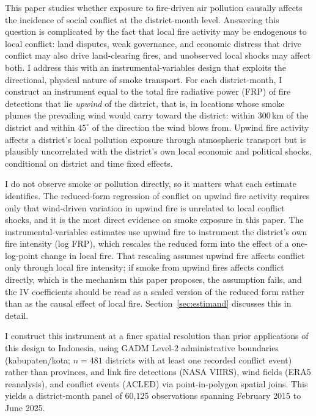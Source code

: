 \documentclass[12pt]{article}
\begin{document}
This paper studies whether exposure to fire-driven air pollution causally affects the incidence of social conflict at the district-month level. Answering this question is complicated by the fact that local fire activity may be endogenous to local conflict: land disputes, weak governance, and economic distress that drive conflict may also drive land-clearing fires, and unobserved local shocks may affect both. I address this with an instrumental-variables design that exploits the directional, physical nature of smoke transport. For each district-month, I construct an instrument equal to the total fire radiative power (FRP) of fire detections that lie \emph{upwind} of the district, that is, in locations whose smoke plumes the prevailing wind would carry toward the district: within 300\,km of the district and within $45^{\circ}$ of the direction the wind blows from. Upwind fire activity affects a district's local pollution exposure through atmospheric transport but is plausibly uncorrelated with the district's own local economic and political shocks, conditional on district and time fixed effects.

I do not observe smoke or pollution directly, so it matters what each estimate identifies. The reduced-form regression of conflict on upwind fire activity requires only that wind-driven variation in upwind fire is unrelated to local conflict shocks, and it is the most direct evidence on smoke exposure in this paper. The instrumental-variables estimates use upwind fire to instrument the district's own fire intensity (log FRP), which rescales the reduced form into the effect of a one-log-point change in local fire. That rescaling assumes upwind fire affects conflict only through local fire intensity; if smoke from upwind fires affects conflict directly, which is the mechanism this paper proposes, the assumption fails, and the IV coefficients should be read as a scaled version of the reduced form rather than as the causal effect of local fire. Section~\ref{sec:estimand} discusses this in detail.

I construct this instrument at a finer spatial resolution than prior applications of this design to Indonesia, using GADM Level-2 administrative boundaries (kabupaten/kota; $n=481$ districts with at least one recorded conflict event) rather than provinces, and link fire detections (NASA VIIRS), wind fields (ERA5 reanalysis), and conflict events (ACLED) via point-in-polygon spatial joins. This yields a district-month panel of 60,125 observations spanning February 2015 to June 2025.
\end{document}
